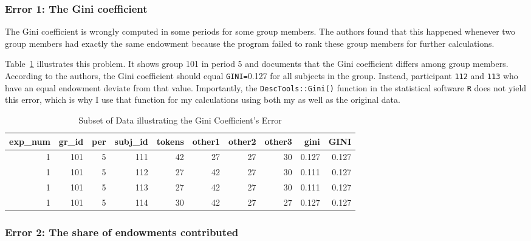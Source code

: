 \documentclass[
  authoryear,
  preprint,
  3p]{elsarticle}
\begin{document}
\hypertarget{error-1-the-gini-coefficient}{%
\subsubsection{Error 1: The Gini
coefficient}\label{error-1-the-gini-coefficient}}

The Gini coefficient is wrongly computed in some periods for some group
members. The authors found that this happened whenever two group members
had exactly the same endowment because the program failed to rank these
group members for further calculations.

Table~\ref{tbl-gini-error} illustrates this problem. It shows group 101
in period 5 and documents that the Gini coefficient differs among group
members. According to the authors, the Gini coefficient should equal
\texttt{GINI=}0.127 for all subjects in the group. Instead, participant
\texttt{112} and \texttt{113} who have an equal endowment deviate from
that value. Importantly, the \texttt{DescTools::Gini()} function in the
statistical software \texttt{R} does not yield this error, which is why
I use that function for my calculations using both my as well as the
original data.

\hypertarget{tbl-gini-error}{}
\begin{table}
\caption{\label{tbl-gini-error}Subset of Data illustrating the Gini Coefficient's Error }\tabularnewline

\centering
\begin{tabular}{r|r|r|r|r|r|r|r|r|r}
\hline
exp\_num & gr\_id & per & subj\_id & tokens & other1 & other2 & other3 & gini & GINI\\
\hline
1 & 101 & 5 & 111 & 42 & 27 & 27 & 30 & 0.127 & 0.127\\
\hline
1 & 101 & 5 & 112 & 27 & 42 & 27 & 30 & 0.111 & 0.127\\
\hline
1 & 101 & 5 & 113 & 27 & 42 & 27 & 30 & 0.111 & 0.127\\
\hline
1 & 101 & 5 & 114 & 30 & 42 & 27 & 27 & 0.127 & 0.127\\
\hline
\end{tabular}
\end{table}

\hypertarget{error-2-the-share-of-endowments-contributed}{%
\subsubsection{Error 2: The share of endowments
contributed}\label{error-2-the-share-of-endowments-contributed}}
\end{document}
